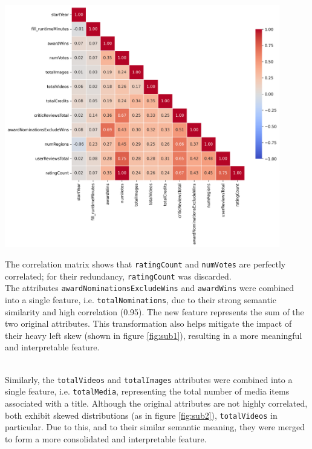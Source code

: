 \noindent
\begin{minipage}{0.50\textwidth}
    \centering
    \includegraphics[width=0.90\textwidth]{plots/correlation_matrix.png}
    \label{fig:correlation_matrix}
\end{minipage}
\hfill
\begin{minipage}{0.47\textwidth}
The correlation matrix shows that \texttt{ratingCount} and \texttt{numVotes} are perfectly correlated;
for their redundancy, \texttt{ratingCount} was discarded.\\

The attributes \texttt{awardNominationsExcludeWins} and \texttt{awardWins} were combined into a single
feature, i.e. \texttt{totalNominations}, due to their strong semantic similarity and high correlation (0.95).
The new feature represents the sum of the two original attributes. This transformation also helps
mitigate the impact of their heavy left skew (shown in figure \ref{fig:sub1}), resulting in a more meaningful and interpretable feature.\\\\
\end{minipage}
\hfill

\vspace{1em}
Similarly, the \texttt{totalVideos} and \texttt{totalImages} attributes were combined into a single
feature, i.e. \texttt{totalMedia}, representing the total number of media items associated with a title.
Although the original attributes are not highly correlated, both exhibit skewed distributions (as in figure \ref{fig:sub2}), \texttt{totalVideos} in particular.
Due to this, and to their similar semantic meaning, they were merged to form a more consolidated and
interpretable feature.


